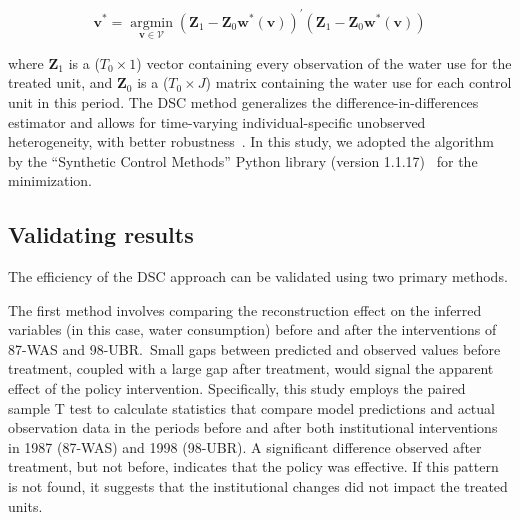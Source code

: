 \begin{equation}
    \mathbf{v}^{*}=\underset{\mathbf{v} \in \mathcal{V}}{\operatorname{argmin}}\left(\mathbf{Z}_{1}-\mathbf{Z}_{0} \mathbf{w}^{*}(\mathbf{v})\right)^{\prime}\left(\mathbf{Z}_{1}-\mathbf{Z}_{0} \mathbf{w}^{*}(\mathbf{v})\right)
\end{equation}

where $\mathbf{Z}_{1}$ is a ($T_0 \times 1$) vector containing every observation of the water use for the treated unit, and $\mathbf{Z}_{0}$ is a ($T_0 \times J$) matrix containing the water use for each control unit in this period.
The DSC method generalizes the difference-in-differences estimator and allows for time-varying individual-specific unobserved heterogeneity, with better robustness~\cite{billmeier2013, smith2015}.
In this study, we adopted the algorithm by the ``Synthetic Control Methods'' Python library (version 1.1.17)~\cite{engelbrektson2023} for the minimization.

\subsection{Validating results}\label{sec:robustness}

The efficiency of the DSC approach can be validated using two primary methods.

The first method involves comparing the reconstruction effect on the inferred variables (in this case, water consumption) before and after the interventions of 87-WAS and 98-UBR.\
Small gaps between predicted and observed values before treatment, coupled with a large gap after treatment, would signal the apparent effect of the policy intervention.
Specifically, this study employs the paired sample T test to calculate statistics that compare model predictions and actual observation data in the periods before and after both institutional interventions in 1987 (87-WAS) and 1998 (98-UBR).
A significant difference observed after treatment, but not before, indicates that the policy was effective.
If this pattern is not found, it suggests that the institutional changes did not impact the treated units.

